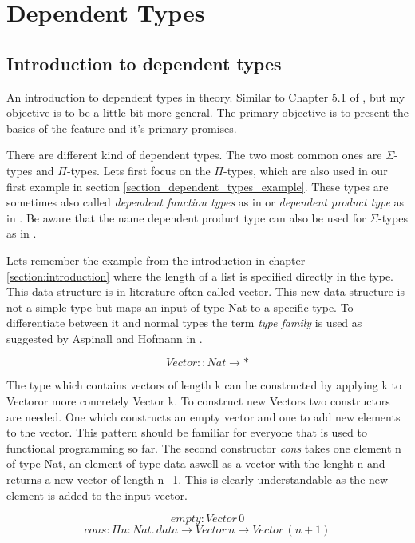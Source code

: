 \section{Dependent Types}
\subsection{Introduction to dependent types}
An introduction to dependent types in theory. Similar to Chapter 5.1 of \cite{10.1145/2841316}, but my objective is to be a little bit more general.
The primary objective is to present the basics of the feature and it's primary promises.

There are different kind of dependent types. The two most common ones are $\Sigma$-types and $\Pi$-types.
Lets first focus on the $\Pi$-types, which are also used in our first example in section \ref{section_dependent_types_example}. These types are sometimes also called \emph{dependent function types} as in \cite{10.1145/2841316} or \emph{dependent product type} as in \cite{10.5555/1076265}. Be aware that the name dependent product type can also be used for $\Sigma$-types as in \cite{10.1145/2841316}.

Lets remember the example from the introduction in chapter \ref{section:introduction} where the length of a list is specified directly in the type. This data structure is in literature \cite{10.1145/2841316} \cite{10.5555/1076265} often called vector.
This new data structure is not a simple type but maps an input of type Nat to a specific type. To differentiate between it and normal types the term \emph{type family} is used as suggested by Aspinall and Hofmann in \cite{10.5555/1076265}.

$$Vector :: Nat \rightarrow *$$

The type which contains vectors of length k can be constructed by applying k to Vectoror more concretely Vector k.
To construct new Vectors two constructors are needed. One which constructs an empty vector and one to add new elements to the vector. This pattern should be familiar for everyone that is used to functional programming so far.
The second constructor \emph{cons} takes one element n of type Nat, an element of type data aswell as a vector with the lenght n and returns a new vector of length n+1. This is clearly understandable as the new element is added to the input vector. 

$$empty: Vector \, 0$$
$$cons : \Pi n : Nat. \, data \rightarrow Vector \, n \rightarrow Vector \, (n+1)$$

